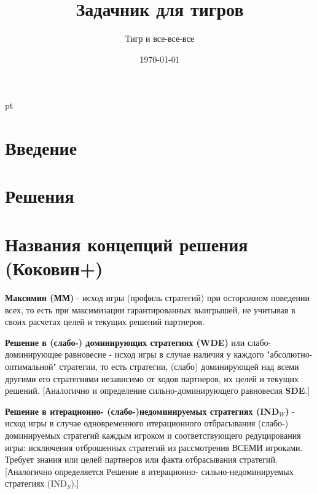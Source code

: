 \documentclass[12pt, a4paper]{article}
\title{Задачник для тигров}
\author{Тигр и все-все-все}
\date{\today}
\theoremstyle{exersize}
\numberwithin{problem}{section}
\begin{document}
\pagestyle{myheadings} 

\nocite{winkler:gpdp} \nocite{colell:mt} \nocite{binmore:fg}
\nocite{ilf:12} \nocite{kino:mind} \nocite{jowas:incorrect} \nocite{redondo:etg} \nocite{sekei:paradox}
\nocite{polisci:lectures} \nocite{cramton:lectures} \nocite{mti:lectures} \nocite{kockesen:lectures} \nocite{brams:dps} \nocite{squintani:nncgt} \nocite{zade:rn} \nocite{osborne:igt} \nocite{osborne:cgt} \nocite{miller:gtw} \nocite{gintis:gte} \nocite{danilov:lte} \nocite{gt.net}

\maketitle
\tableofcontents{}

 pt %

\section{Введение}






\section{Решения}



\section{Названия концепций решения (Коковин+)}
\textbf{Максимин (ММ)} - исход игры (профиль
стратегий) при осторожном поведении всех, то есть
при максимизации гарантированных выигрышей, не
учитывая в своих расчетах целей и текущих решений
партнеров.\vspace{2mm}

\textbf{Решение в (слабо-) доминирующих стратегиях
(WDE)} или слабо-доминирующее равновесие - исход
игры в случае наличия у каждого
"абсолютно-оптимальной" стратегии, то есть
стратегии, (слабо) доминирующей над всеми другими
его стратегиями независимо от ходов партнеров, их
целей и текущих решений. [Аналогично и определение
сильно-доминирующего равновесия
\textbf{SDE}.]\vspace{2mm}

\textbf{Решение в итерационно-
(слабо-)недоминируемых стратегиях (IND${}_W$)} -
исход игры в случае одновременного итерационного
отбрасывания (слабо-) доминируемых стратегий каждым
игроком и соответствующего редуцирования игры:
исключения отброшенных стратегий из рассмотрения
ВСЕМИ игроками. Требует знания или целей партнеров
или факта отбрасывания стратегий. [Аналогично
определяется Решение в итерационно-
сильно-недоминируемых стратегиях
(IND${}_S$).]\vspace{2mm}
\end{document}
